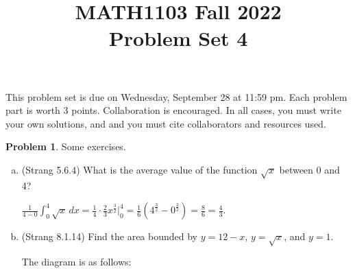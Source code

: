 \documentclass[11pt,oneside]{amsart}
\title{MATH1103 Fall 2022\\
Problem Set 4}
\theoremstyle{definition}
\newtheorem{problem}{Problem}
\begin{document}
    \maketitle
    This problem set is due on Wednesday, September 28 at 11:59 pm. Each problem part is worth 3 points. Collaboration is encouraged. In all cases, you must write your own solutions, and and you must cite collaborators and resources used.


    \begin{problem}
        Some exercises.
        \begin{enumerate}[(a)]
            \item (Strang 5.6.4) What is the average value of the function $\sqrt x$ between 0 and 4?
            \begin{solution}
                $\frac 1{4-0}\int_0^4\sqrt x\,dx=\frac 14\cdot\frac 23 x^{\frac 32}\Big|_0^4=\frac 16(4^{\frac 32}-0^{\frac 32})=\frac 86=\frac 43$.
            \end{solution}
            \item (Strang 8.1.14) Find the area bounded by $y=12-x$, $y=\sqrt x$, and $y=1$.
            \begin{solution}
                The diagram is as follows:
                \begin{center}

\end{center}
\end{solution}
\end{enumerate}
\end{problem}
\end{document}
